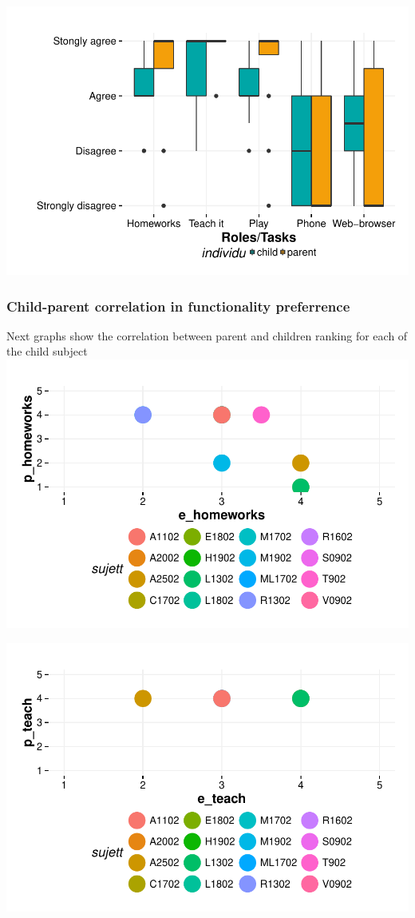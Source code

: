 \documentclass{article}
\begin{document}
\includegraphics{interviews-plot_functionality_parent_enfant}

\subsubsection{Child-parent correlation in functionality preferrence} 
Next graphs show the correlation between parent and children ranking for each of the child subject\newline
\includegraphics{interviews-plot_coirs_parent_enfant_hmk}

\includegraphics{interviews-plot_coirs_parent_enfant_teach}
\end{document}
